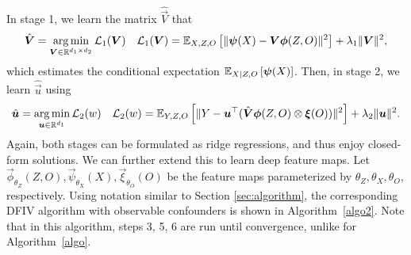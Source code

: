 In stage 1, we learn the matrix $\hat{\vec{V}}$ that 
\begin{align*}
    \hat{\vec{V}} = \argmin_{\vec{V} \in \mathbb{R}^{d_1 \times d_2}} \mathcal{L}_1(\vec{V}) \quad \mathcal{L}_1(\vec{V}) = \expect[X,Z,O]{\|\vec{\psi}(X) - \vec{V}\vec{\phi}(Z, O) \|^2} + \lambda_1 \|\vec{V}\|^2, 
\end{align*}
which estimates the conditional expectation $\expect[X|Z,O]{\vec{\psi}(X)}$. 
Then, in stage 2, we learn $\hat{\vec{u}}$ using
\begin{align*}
    \hat{\vec{u}} = \argmin_{\vec{u} \in \mathbb{R}^{d_1}} \mathcal{L}_2(w) \quad \mathcal{L}_2(w) = \expect[Y,Z,O]{\|Y - \vec{u}^\top (\hat{\vec{V}} \vec{\phi}(Z,O) \otimes \vec{\xi}(O))\|^2} + \lambda_2 \|\vec{u}\|^2.
\end{align*}
Again, both stages can be formulated as ridge regressions, and thus enjoy closed-form solutions. We can further extend this to learn deep feature maps. Let $\vec{\phi}_{\theta_{Z}}(Z,O), \vec{\psi}_{\theta_{X}}(X), \vec{\xi}_{\theta_{O}}(O)$ be the feature maps parameterized by $\theta_{Z}, \theta_{X}, \theta_{O}$, respectively. Using notation similar to Section \ref{sec:algorithm}, the corresponding DFIV algorithm with observable confounders is shown in Algorithm~\ref{algo2}. Note that in this algorithm, steps 3, 5, 6 are run until convergence, unlike for Algorithm~\ref{algo}.  



